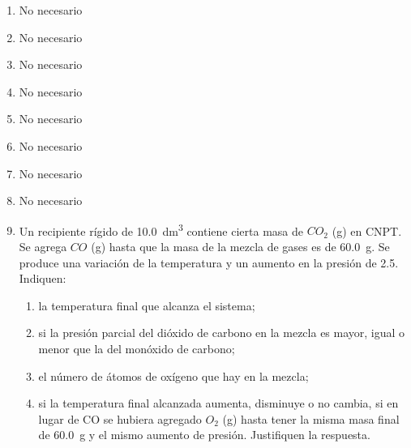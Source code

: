 \documentclass[../Práctica.root.tex]{subfiles}
\begin{document}
\begin{enumerate}
    \item No necesario

    \item No necesario

    \item No necesario

    \item No necesario

    \item No necesario

    \item No necesario

    \item No necesario

    \item No necesario

    \item Un recipiente rígido de \SI{10,0}{\dm\cubed} contiene cierta masa de $CO_2$ (g) en CNPT. Se agrega $CO$ (g)
          hasta que la masa de la mezcla de gases es de \SI{60,0}{\gram}. Se produce una variación de la
          temperatura y un aumento en la presión de \SI{2,5}{\atm}. Indiquen:
          \begin{enumerate}
              \item la temperatura final que alcanza el sistema;
              \item si la presión parcial del dióxido de carbono en la mezcla es mayor, igual o menor que
                    la del monóxido de carbono;
              \item el número de átomos de oxígeno que hay en la mezcla;
              \item si la temperatura final alcanzada aumenta, disminuye o no cambia, si en lugar de CO
                    se hubiera agregado $O_2$ (g) hasta tener la misma masa final de \SI{60,0}{\gram} y el mismo
                    aumento de presión. Justifiquen la respuesta.
          \end{enumerate}
\end{enumerate}
\end{document}
